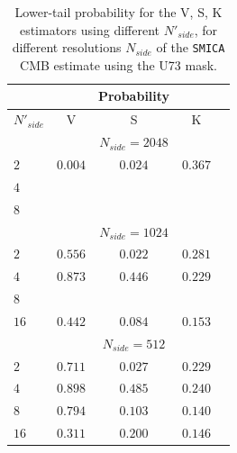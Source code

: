 \begin{table}
\centering
\caption{Lower-tail probability for the V, S, K estimators using different $N'_{side}$, for different resolutions $N_{side}$ of the  \texttt{SMICA} CMB estimate using the U73 mask.}
\label{table:2}
\begin{tabular}{@{}lcccc}
\hline 
  & & Probability & \\
\hline  
$N'_{side}$ & V & S & K \\ 
\hline  
 & & $N_{side}=2048$ & \\
$2$ & $0.004 $ & $ 0.024$ & $0.367 $ \\ 
$4$ & $ $ & $ $ & $ $  \\
$8$ & $ $ & $  $ & $  $  \\
 & & $ N_{side} = 1024 $ & \\
$2$ & $ 0.556 $ & $ 0.022 $ & $ 0.281 $ \\ 
$4$ & $ 0.873 $ & $ 0.446 $ & $ 0.229 $  \\
$8$ & $  $ & $  $ & $  $  \\
$16$ & $ 0.442 $ & $ 0.084 $ & $ 0.153 $  \\
 & & $N_{side} = 512$ & \\
$2$ & $0.711 $ & $ 0.027 $ & $ 0.229 $ \\ 
$4$ & $ 0.898 $ & $ 0.485 $ & $ 0.240 $  \\
$8$ & $ 0.794 $ & $ 0.103 $ & $ 0.140 $  \\
$16$ & $ 0.311 $ & $ 0.200 $ & $ 0.146 $  \\

\end{tabular}
\end{table}
